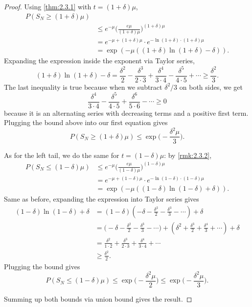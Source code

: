 \begin{proof}
Using \cref{thm:2.3.1} with $t = (1 + \delta)\mu$, 
\begin{align*}
	P(S_N \geq (1 + \delta)\mu) \\
	&\leq e^{-\mu} \biggl( \frac{e \mu}{(1 + \delta)\mu} \biggr)^{(1 + \delta)\mu} \\
	&= e^{-\mu + (1 + \delta)\mu} \cdot e^{-\ln{(1 + \delta)} \cdot (1 + \delta)\mu} \\
	&= \exp{(-\mu((1 + \delta)\ln{(1 + \delta)} - \delta))}.
\end{align*}
Expanding the expression inside the exponent via Taylor series, 
\[ (1 + \delta)\ln{(1 + \delta)} - \delta = \frac{\delta^2}{2} - \frac{\delta^3}{2 \cdot 3} 
+ \frac{\delta^4}{3 \cdot 4} - \frac{\delta^5}{4 \cdot 5} + \cdots \geq \frac{\delta^2}{3}. \]
The last inequality is true because when we subtract $\delta^2 / 3$ on both sides, we get 
\[ \frac{\delta^4}{3 \cdot 4} - \frac{\delta^5}{4 \cdot 5} + \frac{\delta^6}{5 \cdot 6} - \cdots \geq 0 \]
because it is an alternating series with decreasing terms and a positive first term. Plugging the bound 
above into our first equation gives 
\[ P(S_N \geq (1 + \delta)\mu) \leq \exp{\biggl( -\frac{\delta^2 \mu}{3} \biggr)}. \]

As for the left tail, we do the same for $t = (1 - \delta)\mu$: by \cref{rmk:2.3.2},
\begin{align*}
	P(S_N \leq (1 - \delta)\mu)
	&\leq e^{-\mu} \biggl( \frac{e \mu}{(1 - \delta)\mu} \biggr)^{(1 - \delta)\mu} \\
	&= e^{-\mu + (1 - \delta)\mu} \cdot e^{-\ln{(1 - \delta)} \cdot (1 - \delta)\mu} \\
	&= \exp{(-\mu((1 - \delta)\ln{(1 - \delta)} + \delta))}.
\end{align*}
Same as before, expanding the expression into Taylor series gives 
\begin{align*}
	(1 - \delta)\ln{(1 - \delta)} + \delta 
	&= (1 - \delta)(-\delta - \frac{\delta^2}{2} - \frac{\delta^3}{3} - \cdots) + \delta \\
	&= \biggl( -\delta - \frac{\delta^2}{2} - \frac{\delta^3}{3} - \cdots \biggr) + 
	(\delta^2 + \frac{\delta^3}{2} + \frac{\delta^4}{3} + \cdots) + \delta \\
	&= \frac{\delta^2}{1 \cdot 2} + \frac{\delta^3}{2 \cdot 3} + \frac{\delta^4}{3 \cdot 4} + \cdots \\
	&\geq \frac{\delta^2}{2}.
\end{align*}
Plugging the bound gives 
\[ P(S_N \leq (1 - \delta)\mu) \leq \exp{\biggl( -\frac{\delta^2 \mu}{2} \biggr)} 
\leq \exp{\biggl( -\frac{\delta^2 \mu}{3} \biggr)}. \]

Summing up both bounds via union bound gives the result.
\end{proof}

